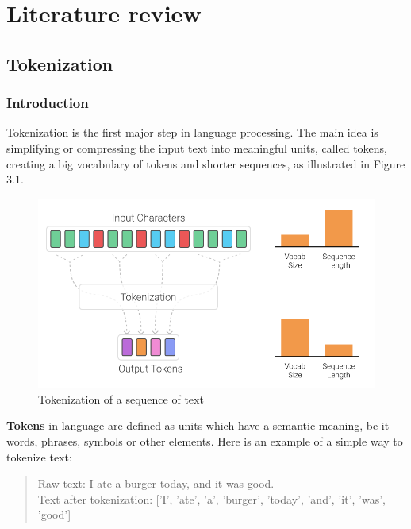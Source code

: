 %
%

\chapter{Literature review}\label{ch:literature}

\section{Tokenization}\label{sec:tokenization}

\subsection{Introduction}

Tokenization is the first major step in language processing. The main idea is simplifying or compressing the input text into meaningful units, called tokens, creating a big vocabulary of tokens and shorter sequences, as illustrated in Figure 3.1.~\cite{manning2008introduction}

\begin{figure}[!ht]
    \centering
    \includegraphics[width=14cm]{figures/tokenization.png}
    \caption{Tokenization of a sequence of text}
\end{figure}

\textbf{Tokens} in language are defined as units which have a semantic meaning, be it words, phrases, symbols or other elements. Here is an example of a simple way to tokenize text:

\begin{quote}
    Raw text: I ate a burger today, and it was good.\\
    Text after tokenization: ['I', 'ate', 'a', 'burger', 'today', 'and', 'it', 'was', 'good']
\end{quote}

